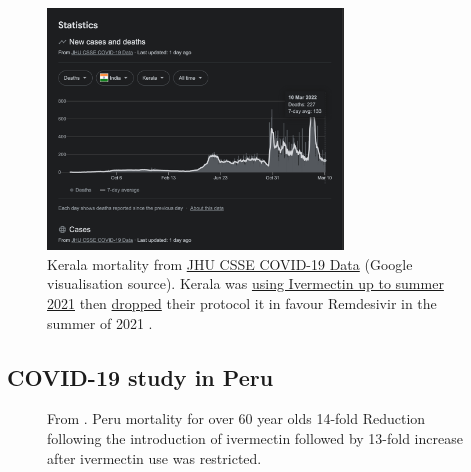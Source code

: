 \documentclass[11pt,a4paper,notitlepage]{report}
\begin{document}
\begin{figure}[h]
    \centering
    \includegraphics[width=0.7\textwidth]{india-kerala-mortality}
    \caption{Kerala mortality from \href{https://github.com/CSSEGISandData/COVID-19}{JHU CSSE COVID-19 Data} (Google visualisation source). Kerala was \href{https://dhs.kerala.gov.in/wp-content/uploads/2021/04/Kerala-State-COVID-19-guidelines-Version-3.pdf}{using Ivermectin up to summer 2021} \cite{keralagov24042021} then \href{https://www.thehindu.com/news/national/kerala/kerala-revises-covid-19-treatment-guidelines/article35775373.ece}{dropped} their protocol it in favour Remdesivir in the summer of 2021 \cite{hindu06082021}.}
    \label{fig:india-kerala-mortality}
\end{figure}

\clearpage

\subsection*{COVID-19 study in Peru}

\begin{figure}[h]
    \centering
    \caption{From \citet{Chamie2021}. Peru mortality for over 60 year olds 14-fold Reduction following the introduction of ivermectin followed by 13-fold increase after ivermectin use was restricted.}
    \label{fig:peru-mortality}
\end{figure}
\end{document}
